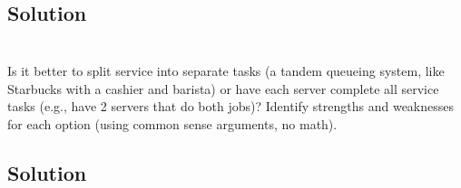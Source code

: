 \documentclass{amsart}
\begin{document}
\subsection*{Solution}

\section{} %
Is it better to split service into separate tasks (a tandem queueing system, like Starbucks
with a cashier and barista) or have each server complete all service tasks (e.g., have 2
servers that do both jobs)? Identify strengths and weaknesses for each option (using
common sense arguments, no math).

\subsection*{Solution}
\end{document}
